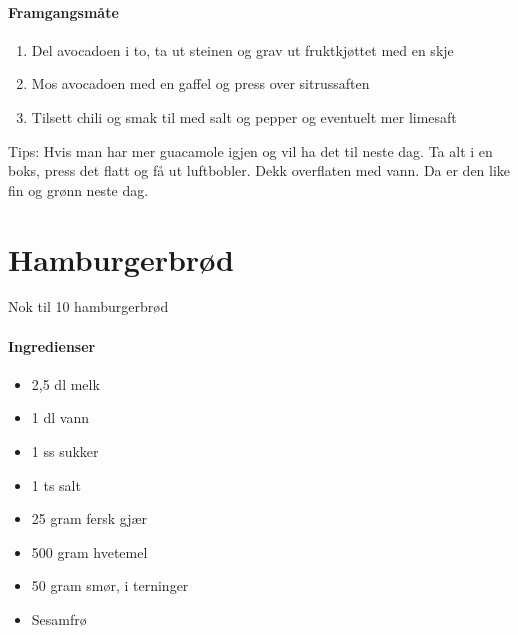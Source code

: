 \documentclass[12pt,a4paper]{book}
\begin{document}
\paragraph{Framgangsmåte}
\begin{enumerate}[noitemsep]
	\item Del avocadoen i to, ta ut steinen og grav ut fruktkjøttet med en skje
	\item Mos avocadoen med en gaffel og press over sitrussaften
	\item Tilsett chili og smak til med salt og pepper og eventuelt mer limesaft
\end{enumerate}


Tips: Hvis man har mer guacamole igjen og vil ha det til neste dag. Ta alt i en boks, press det flatt og få ut luftbobler. Dekk overflaten med vann. Da er den like fin og grønn neste dag.
\clearpage{}
\clearpage{}\section{﻿Hamburgerbrød}
Nok til 10 hamburgerbrød

\paragraph{Ingredienser}
\begin{itemize}[noitemsep]
		\item 2,5 dl melk
		\item 1 dl vann
		\item 1 ss sukker
		\item 1 ts salt
		\item 25 gram fersk gjær
		\item 500 gram hvetemel
		\item 50 gram smør, i terninger
		\item Sesamfrø
\end{itemize}
\end{document}
